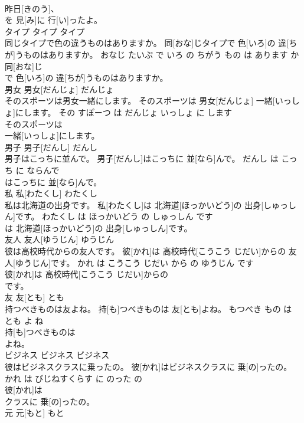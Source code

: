 \documentclass[8pt]{extreport}
\begin{document}
\begin{CJK}{UTF8}{min}
\\	昨日[きのう]、
\\	を 見[み]に 行[い]ったよ。			
\\	タイプ	タイプ	タイプ	
\\	同じタイプで色の違うものはありますか。	同[おな]じタイプで 色[いろ]の 違[ちが]うものはありますか。	おなじ たいぷ で いろ の ちがう もの は あります か	
\\	同[おな]じ
\\	で 色[いろ]の 違[ちが]うものはありますか。			
\\	男女	男女[だんじょ]	だんじょ	
\\	そのスポーツは男女一緒にします。	そのスポーツは 男女[だんじょ] 一緒[いっしょ]にします。	その すぽーつ は だんじょ いっしょ に します	
\\	そのスポーツは
\\	一緒[いっしょ]にします。			
\\	男子	男子[だんし]	だんし	
\\	男子はこっちに並んで。	男子[だんし]はこっちに 並[なら]んで。	だんし は こっち に ならんで	
\\	はこっちに 並[なら]んで。			
\\	私	私[わたくし]	わたくし	
\\	私は北海道の出身です。	私[わたくし]は 北海道[ほっかいどう]の 出身[しゅっしん]です。	わたくし は ほっかいどう の しゅっしん です	
\\	は 北海道[ほっかいどう]の 出身[しゅっしん]です。			
\\	友人	友人[ゆうじん]	ゆうじん	
\\	彼は高校時代からの友人です。	彼[かれ]は 高校時代[こうこう じだい]からの 友人[ゆうじん]です。	かれ は こうこう じだい から の ゆうじん です	
\\	彼[かれ]は 高校時代[こうこう じだい]からの
\\	です。			
\\	友	友[とも]	とも	
\\	持つべきものは友よね。	持[も]つべきものは 友[とも]よね。	もつべき もの は とも よ ね	
\\	持[も]つべきものは
\\	よね。			
\\	ビジネス	ビジネス	ビジネス	
\\	彼はビジネスクラスに乗ったの。	彼[かれ]はビジネスクラスに 乗[の]ったの。	かれ は びじねすくらす に のった の	
\\	彼[かれ]は
\\	クラスに 乗[の]ったの。			
\\	元	元[もと]	もと	

\end{CJK}
\end{document}
